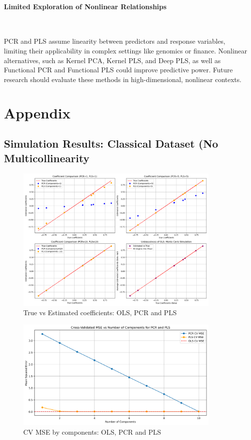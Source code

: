 \documentclass[11pt,twoside,a4paper]{article}
\begin{document}
\paragraph{Limited Exploration of Nonlinear Relationships} \ \

PCR and PLS assume linearity between predictors and response variables, limiting their applicability in complex settings like genomics or finance. Nonlinear alternatives, such as Kernel PCA, Kernel PLS, and Deep PLS, as well as Functional PCR and Functional PLS could improve predictive power. Future research should evaluate these methods in high-dimensional, nonlinear contexts. 

\newpage

\section{Appendix}
\subsection{Simulation Results: Classical Dataset (No Multicollinearity}

\begin{figure}[H]
    \centering
    \includegraphics[width=0.9\textwidth]{First_plot.png}
    \caption{True vs Estimated coefficients: OLS, PCR and PLS}
    \label{fig:Classic_data_analysis}
\end{figure}

\begin{figure}[H]
    \centering
    \includegraphics[width=0.9\textwidth]{Second_plot.png}
    \caption{CV MSE by components: OLS, PCR and PLS}
    \label{fig:Classic_data_analysis}
\end{figure}
\end{document}
